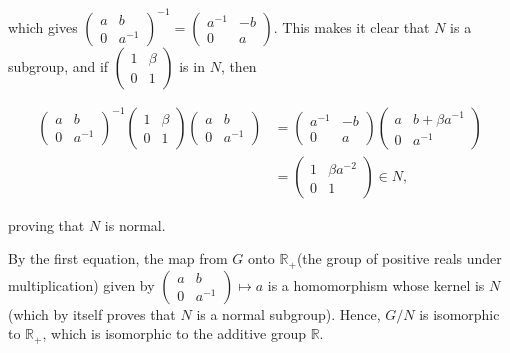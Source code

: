 \documentclass[10pt]{article}
\begin{document}
which gives $\left(\begin{array}{cc}a & b \\ 0 & a^{-1}\end{array}\right)^{-1}=\left(\begin{array}{cc}a^{-1} & -b \\ 0 & a\end{array}\right)$. This makes it clear that $N$ is a subgroup, and if $\left(\begin{array}{ll}1 & \beta \\ 0 & 1\end{array}\right)$ is in $N$, then

$$
\begin{aligned}
\left(\begin{array}{cc}
a & b \\
0 & a^{-1}
\end{array}\right)^{-1}\left(\begin{array}{ll}
1 & \beta \\
0 & 1
\end{array}\right)\left(\begin{array}{cc}
a & b \\
0 & a^{-1}
\end{array}\right) &=\left(\begin{array}{cc}
a^{-1} & -b \\
0 & a
\end{array}\right)\left(\begin{array}{cc}
a & b+\beta a^{-1} \\
0 & a^{-1}
\end{array}\right) \\
&=\left(\begin{array}{cc}
1 & \beta a^{-2} \\
0 & 1
\end{array}\right) \in N,
\end{aligned}
$$

proving that $N$ is normal.

By the first equation, the map from $G$ onto $\mathbb{R}_{+}$(the group of positive reals under multiplication) given by $\left(\begin{array}{cc}a & b \\ 0 & a^{-1}\end{array}\right) \mapsto a$ is a homomorphism whose kernel is $N$ (which by itself proves that $N$ is a normal subgroup). Hence, $G / N$ is isomorphic to $\mathbb{R}_{+}$, which is isomorphic to the additive group $\mathbb{R}$.
\end{document}
